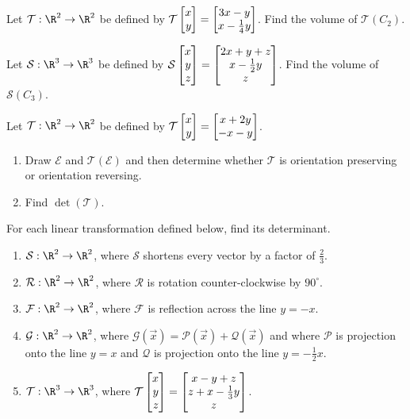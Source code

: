 \begin{exercises}
	\begin{problist}
		\prob Let $\mathcal{T}:\R^{2}\to\R^{2}$ be defined by $\mathcal{T}\mat{x\\y}
		=\matc{3x-y\\x-\tfrac{1}{4}y}$. Find the volume of $\mathcal{T}(C_{2})$.

		\prob Let $\mathcal{S}:\R^{3}\to\R^{3}$ be defined by
		$\mathcal{S}\mat{x\\y\\z}=\matc{2x+y+z\\x-\tfrac{1}{2}y\\z}$. Find the volume
		of $\mathcal{S}(C_{3})$.

		\prob Let $\mathcal{T}:\R^{2}\to\R^{2}$ be defined by $\mathcal{T}\mat{x\\y}
		=\matc{x+2y\\-x-y}$.
		\begin{enumerate}
			\item Draw $\mathcal{E}$ and $\mathcal{T}(\mathcal{E})$ and then determine
				whether $\mathcal{T}$ is orientation preserving or orientation reversing.

			\item Find $\det(\mathcal{T})$.
		\end{enumerate}

		\prob For each linear transformation defined below, find its determinant.
		\begin{enumerate}
			\item $\mathcal{S}:\R^{2}\to\R^{2}$, where $\mathcal{S}$ shortens
				every vector by a factor of $\tfrac{2}{3}$.

			\item $\mathcal{R}:\R^{2}\to\R^{2}$, where $\mathcal{R}$ is rotation
				counter-clockwise by $90^{\circ}$.

			\item $\mathcal{F}:\R^{2}\to\R^{2}$, where $\mathcal{F}$ is
				reflection across the line $y=-x$.

			\item $\mathcal{G}:\R^{2}\to\R^{2}$, where
				$\mathcal{G}(\vec x)=\mathcal{P}(\vec x)+ \mathcal{Q}(\vec x)$
				and where $\mathcal{P}$ is projection onto the line $y=x$ and
				$\mathcal{Q}$ is projection onto the line $y=-\tfrac{1}{2}x$.

			\item $\mathcal{T}:\R^{3}\to\R^{3}$, where
				$\mathcal{T}\mat{x\\y\\z}=\matc{x-y+z\\z+x-\tfrac{1}{3}y\\z}$.


\end{enumerate}
\end{problist}
\end{exercises}
